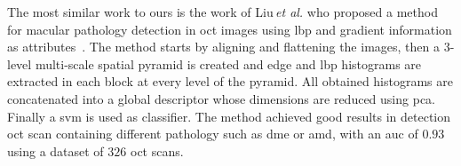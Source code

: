 The most similar work to ours is the work of Liu\,\textit{et al.} who proposed a method for macular pathology detection in \ac{oct} images using \ac{lbp} and gradient information as attributes~\cite{Liu2011}.
The method starts by aligning and flattening the images, then a $3$-level multi-scale spatial pyramid is created and edge and \ac{lbp} histograms are extracted in each block at every level of the pyramid. 
All obtained histograms are concatenated into a global descriptor whose dimensions are reduced using \ac{pca}. Finally a \ac{svm} is used as classifier. 
The method achieved good results in detection \ac{oct} scan containing different pathology such as \ac{dme} or \ac{amd}, with an \ac{auc} of $0.93$ using a dataset of $326$ \ac{oct} scans.  
